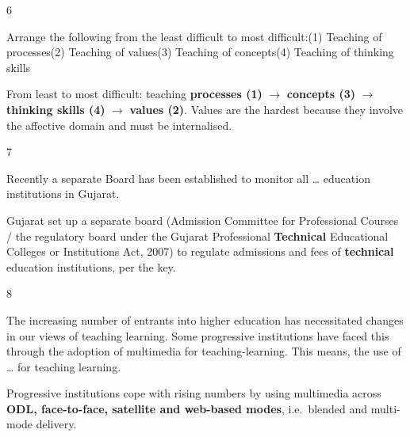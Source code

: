 \begin{question}{6}
{Arrange the following from the least difficult to most difficult:\newline (1) Teaching of processes\newline (2) Teaching of values\newline (3) Teaching of concepts\newline (4) Teaching of thinking skills\par}
\begin{explain}
From least to most difficult: teaching \textbf{processes (1)} $\rightarrow$ \textbf{concepts (3)} $\rightarrow$ \textbf{thinking skills (4)} $\rightarrow$ \textbf{values (2)}. Values are the hardest because they involve the affective domain and must be internalised.
\end{explain}
\end{question}

\begin{question}{7}
{Recently a separate Board has been established to monitor all \ldots{} education institutions in Gujarat.\par}
\begin{explain}
Gujarat set up a separate board (Admission Committee for Professional Courses / the regulatory board under the Gujarat Professional \textbf{Technical} Educational Colleges or Institutions Act, 2007) to regulate admissions and fees of \textbf{technical} education institutions, per the key.
\end{explain}
\end{question}

\begin{question}{8}
{The increasing number of entrants into higher education has necessitated changes in our views of teaching learning. Some progressive institutions have faced this through the adoption of multimedia for teaching-learning. This means, the use of \ldots{} for teaching learning.\par}
\begin{explain}
Progressive institutions cope with rising numbers by using multimedia across \textbf{ODL, face-to-face, satellite and web-based modes}, i.e.\ blended and multi-mode delivery.
\end{explain}
\end{question}

